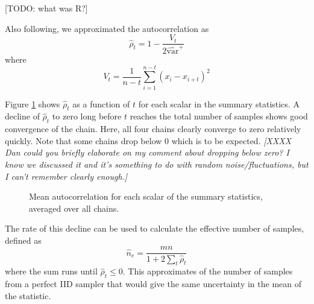 \documentclass{article}
\begin{document}
[TODO: what was R?]

Also following\cite{gelman2013bayesian}, we approximated the autocorrelation as
\[
\hat{\rho}_t = 1 - \frac{V_t}{2\widehat{\text{var}}^+}
\]
where
\[
V_t = \frac{1}{n-t} \sum_{i=1}^{n-t} (x_i - x_{i+t})^2
\]

Figure \ref{figAutocorrelation} shows $\hat{\rho}_t$ as a function of $t$ for each scalar in the summary statistics. A decline of $\hat{\rho}_t$ to zero long before $t$ reaches the total number of samples shows good convergence of the chain. Here, all four chains clearly converge to zero relatively quickly. Note that some chains drop below 0 which is to be expected. \textit{[XXXX Dan could you briefly elaborate on my comment about dropping below zero? I know we discussed it and it's something to do with random noise/fluctuations, but I can't remember clearly enough.]}

\begin{figure}[ht]
	\centering
	\caption{Mean autocorrelation for each scalar of the summary statistics, averaged over all chains. }
	\label{figAutocorrelation}
\end{figure}

The rate of this decline can be used to calculate the effective number of samples, defined as
\[
\hat{n}_e = \frac{mn}{1 + 2\sum_{t} \hat{\rho}_t}
\]
where the sum runs until $\hat{\rho}_t \le 0$. This approximates of the number of samples from a perfect IID sampler that would give the same uncertainty in the mean of the statistic.
\end{document}
